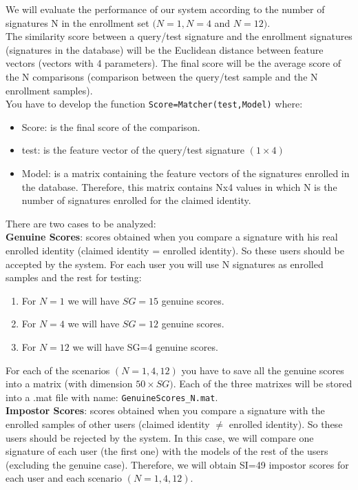 \documentclass[a4paper]{article}
\def\inline{\lstinline[basicstyle=\ttfamily,keywordstyle={}]}
\begin{document}
{We will evaluate the performance of our system according to the number of signatures N in the enrollment set \((N=1, N=4 \) and \(N=12)\).\\

The similarity score between a query/test signature and the enrollment signatures (signatures in the database) will be the Euclidean distance between feature vectors (vectors with 4 parameters).  The final score will be the average score of the N comparisons (comparison between the query/test sample and the N enrollment samples).\\

You have to develop the function \inline{Score=Matcher(test,Model)} where:
\begin{itemize}
\item	Score: is the final score of the comparison.
\item	test: is the feature vector of the query/test signature \((1\times4)\)
\item	Model: is a matrix containing the feature vectors of the signatures enrolled in the database. Therefore, this matrix contains Nx4 values in which N is the number of signatures enrolled for the claimed identity.
\end{itemize}
There are two cases to be analyzed:\\

\textbf{Genuine Scores}: scores obtained when you compare a signature with his real enrolled identity (claimed identity = enrolled identity). So these users should be accepted by the system. For each user you will use N signatures as enrolled samples and the rest for testing:
\begin{enumerate}
\item	For \(N=1\) we will have \(SG=15\) genuine scores.
\item	For \(N=4\) we will have \(SG=12\) genuine scores.
\item	For \(N=12\) we will have SG=4 genuine scores.
\end{enumerate}
For each of the scenarios \((N=1,4,12)\) you have to save all the genuine scores into a matrix (with dimension \(50 \times SG)\). Each of the three matrixes will be stored into a .mat file with name: \inline{GenuineScores_N.mat}.\\

\textbf{Impostor Scores}: scores obtained when you compare a signature with the enrolled samples of other users (claimed identity $\neq$ enrolled identity). So these users should be rejected by the system. In this case, we will compare one signature of each user (the first one) with the models of the rest of the users (excluding the genuine case). Therefore, we will obtain SI=49 impostor scores for each user and each scenario \((N=1,4,12)\). 

}
\end{document}
